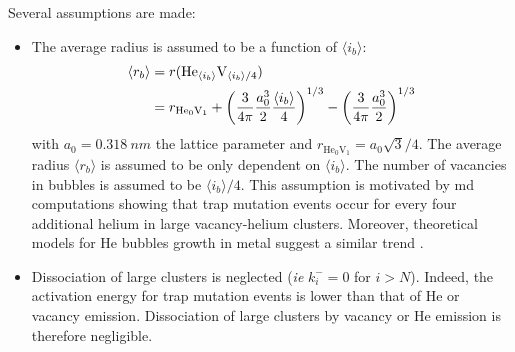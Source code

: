 Several assumptions are made:
\begin{itemize}
    \item The average radius is assumed to be a function of $\langle i_b \rangle$:
    \begin{equation}
        \begin{split}
            \langle r_b \rangle &= r(\mathrm{He}_{\langle i_b \rangle}\mathrm{V}_{\langle i_b \rangle/4}) \\
            &= r_{\mathrm{He}_0 \mathrm{V}_1} + \left(\frac{3}{4 \pi} \frac{a_0^3}{2} \frac{\langle i_b \rangle}{4} \right)^{1/3} - \left(\frac{3}{4 \pi} \frac{a_0^3}{2} \right)^{1/3}
        \end{split}
        \labeq{radius average}
    \end{equation}
    with $a_0 = \SI{0.318}{nm}$ the lattice parameter and $r_{\mathrm{He}_0 \mathrm{V}_1} =  a_0 \sqrt{3}/4$.
    The average radius $\langle r_b \rangle$ is assumed to be only dependent on $\langle i_b \rangle$.
    The number of vacancies in bubbles is assumed to be $\langle i_b \rangle/4$.
    This assumption is motivated by \gls{md} computations showing that \gls{trap mutation} events occur for every four additional helium in large \gls{vacancy}-helium clusters.
    Moreover, theoretical models for He bubbles growth in metal suggest a similar trend .
    \item Dissociation of large clusters is neglected (\textit{ie} $k_i^- = 0$ for $i>N$).
    Indeed, the activation energy for \gls{trap mutation} events is lower than that of He or \gls{vacancy} emission. Dissociation of large clusters by \gls{vacancy} or He emission is therefore negligible.
\end{itemize}

